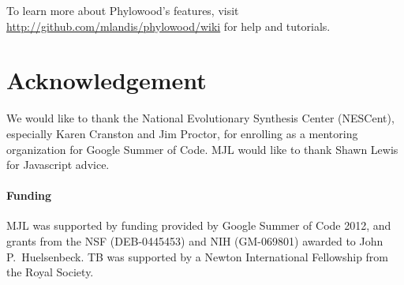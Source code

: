 \documentclass{bioinfo}
\begin{document}
To learn more about Phylowood's features, visit \\
 \href{http://github.com/mlandis/phylowood/wiki}{http://github.com/mlandis/phylowood/wiki} for help and tutorials.
 
\section*{Acknowledgement}

We would like to thank the National Evolutionary Synthesis Center (NESCent), especially Karen Cranston and Jim Proctor, for enrolling as a mentoring organization for Google Summer of Code. MJL would like to thank Shawn Lewis for Javascript advice.

\paragraph{Funding\textcolon} 

MJL was supported by funding provided by Google Summer of Code 2012, and grants from the NSF (DEB-0445453) and NIH (GM-069801) awarded to John P.\ Huelsenbeck.  TB was supported by a Newton International Fellowship from the Royal Society.  



\end{document}
